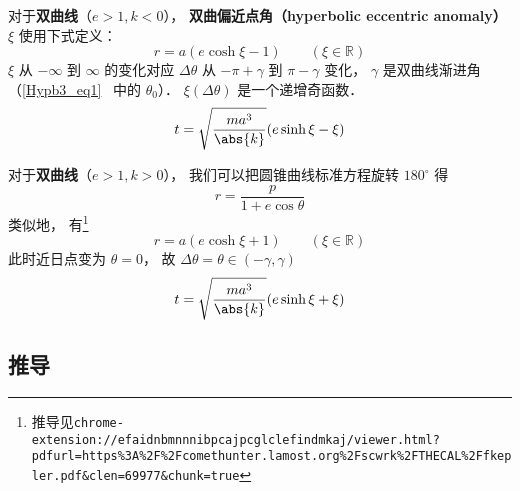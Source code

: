 对于\textbf{双曲线}（$e>1, k<0$）， \textbf{双曲偏近点角（hyperbolic eccentric anomaly）} $\xi$ 使用下式定义：
\begin{equation}\label{EqMoKp_eq2} %
r = a(e\cosh\xi - 1) \qquad (\xi \in \mathbb R)
\end{equation}
$\xi$ 从 $-\infty$ 到 $\infty$ 的变化对应 $\Delta\theta$ 从 $-\pi+\gamma$ 到 $\pi-\gamma$ 变化， $\gamma$ 是双曲线渐进角（\autoref{Hypb3_eq1}~ 中的 $\theta_0$）． $\xi(\Delta\theta)$ 是一个递增奇函数．
\begin{equation}\label{EqMoKp_eq4} %
t = \sqrt{\frac{ma^3}{\abs{k}}} (e\sinh\xi - \xi)
\end{equation}

对于\textbf{双曲线}（$e>1, k>0$）， 我们可以把圆锥曲线标准方程旋转 $180^\circ$ 得
\begin{equation} %
r = \frac{p}{1 + e\cos\theta}
\end{equation}
类似地， 有\footnote{推导见\lstinline|chrome-extension://efaidnbmnnnibpcajpcglclefindmkaj/viewer.html?pdfurl=https%3A%2F%2Fcomethunter.lamost.org%2Fscwrk%2FTHECAL%2Ffkepler.pdf&clen=69977&chunk=true|}
\begin{equation} %
r = a(e\cosh\xi + 1) \qquad (\xi \in \mathbb R)
\end{equation}
此时近日点变为 $\theta = 0$， 故 $\Delta\theta = \theta \in (-\gamma, \gamma)$
\begin{equation} %
t = \sqrt{\frac{ma^3}{\abs{k}}} (e\sinh\xi + \xi)
\end{equation}

\subsection{推导}
